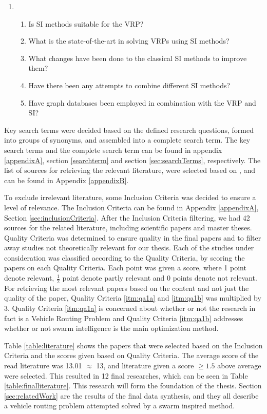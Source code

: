 \begin{enumerate}[label=\textbf{\arabic*})]
\item 
    \begin{enumerate}
    \item Is SI methods suitable for the VRP?
    \item What is the state-of-the-art in solving VRPs using SI methods?
    \item What changes have been done to the classical SI methods to improve them?
    \item Have there been any attempts to combine different SI methods?
    \item Have graph databases been employed in combination with the VRP and SI?
    \end{enumerate}
\end{enumerate}

Key search terms were decided based on the defined research questions, formed into groups of synonyms, and assembled into a complete search term. The key search terms and the complete search term can be found in appendix \ref{appendixA}, section \vref{searchterm} and section \vref{sec:searchTerms}, respectively. The list of sources for retrieving the  relevant literature, were selected based on \citep[p.3]{kofod2014}, and can be found in Appendix \vref{appendixB}. 

To exclude irrelevant literature, some Inclusion Criteria was decided to ensure a level of relevance. The Inclusion Criteria can be found in Appendix \ref{appendixA}, Section \ref{sec:inclusionCriteria}. After the Inclusion Criteria filtering, we had 42 sources for the related literature, including scientific papers and master theses. Quality Criteria was determined to ensure quality in the final papers and to filter away studies not theoretically relevant for our thesis. Each of the studies under consideration was classified according to the Quality Criteria, by scoring the papers on each Quality Criteria. Each point was given a score, where 1 point denote relevant, $\frac{1}{2}$ point denote partly relevant and 0 points denote not relevant. For retrieving the most relevant papers based on the content and not just the quality of the paper, Quality Criteria \ref{itm:qa1a} and \vref{itm:qa1b} was multiplied by 3. Quality Criteria \ref{itm:qa1a} is concerned about whether or not the research in fact is a Vehicle Routing Problem and Quality Criteria \ref{itm:qa1b} addresses whether or not swarm intelligence is the main optimization method. 

Table \vref{table:literature} shows the papers that were selected based on the Inclusion Criteria and the scores given based on Quality Criteria. The average score of the read literature was 13.01 $\approx$ 13, and literature given a score $\geq{1.5}$ above average were selected. This resulted in 12 final researches, which can be seen in Table \vref{table:finalliterature}. This research will form the foundation of the thesis. Section \vref{sec:relatedWork} are the results of the final data synthesis, and they all describe a vehicle routing problem attempted solved by a swarm inspired method.
